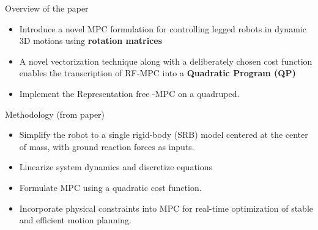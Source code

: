 \documentclass{beamer}
\begin{document}
\begin{frame}{Overview of the paper}
\begin{itemize}
  \item Introduce a novel MPC formulation for controlling legged robots in dynamic 3D motions using \textbf{rotation matrices}
  \item A novel vectorization technique along with a deliberately chosen cost function enables the transcription of RF-MPC into a \textbf{Quadratic Program (QP)}
  \item Implement the Representation free -MPC on a quadruped. 
\end{itemize}

\end{frame}\normalfont

\begin{frame}{Methodology (from paper)}
    \begin{itemize}
        \item Simplify the robot to a single rigid-body (SRB) model centered at the center of mass, with ground reaction forces as inputs.
        \item Linearize system dynamics and discretize equations
        \item Formulate MPC using a quadratic cost function.
        \item Incorporate physical constraints into MPC for real-time optimization of stable and efficient motion planning.
    \end{itemize}
    \vfill %
    
\end{frame}\normalfont
\end{document}
